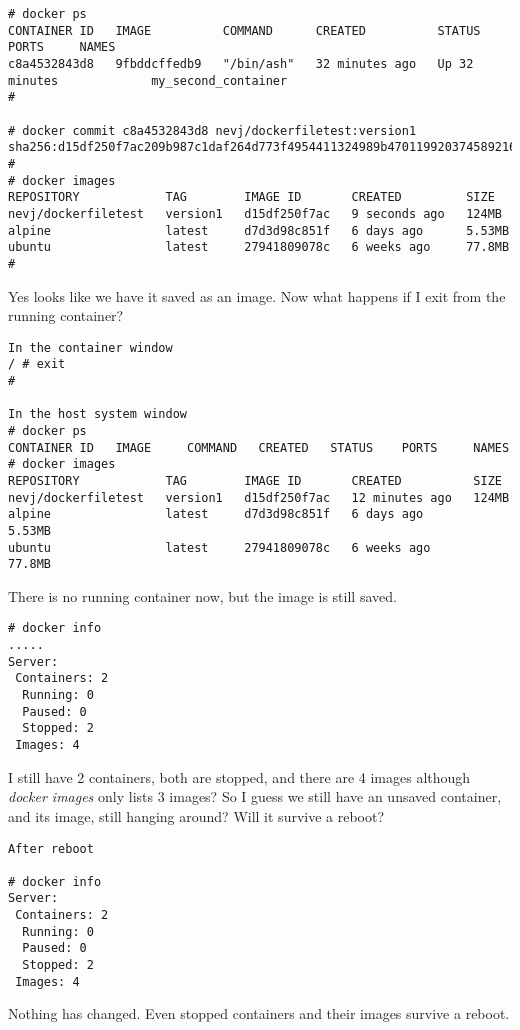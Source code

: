 \documentclass{article}  %
\begin{document}
\begin{verbatim}
# docker ps
CONTAINER ID   IMAGE          COMMAND      CREATED          STATUS          PORTS     NAMES
c8a4532843d8   9fbddcffedb9   "/bin/ash"   32 minutes ago   Up 32 minutes             my_second_container
# 

# docker commit c8a4532843d8 nevj/dockerfiletest:version1
sha256:d15df250f7ac209b987c1daf264d773f4954411324989b470119920374589216
# 
# docker images
REPOSITORY            TAG        IMAGE ID       CREATED         SIZE
nevj/dockerfiletest   version1   d15df250f7ac   9 seconds ago   124MB
alpine                latest     d7d3d98c851f   6 days ago      5.53MB
ubuntu                latest     27941809078c   6 weeks ago     77.8MB
# 
\end{verbatim}
 Yes looks like we have it saved as an image.
Now what happens if I exit from the running container?
\begin{verbatim}
In the container window
/ # exit
# 

In the host system window
# docker ps
CONTAINER ID   IMAGE     COMMAND   CREATED   STATUS    PORTS     NAMES
# docker images
REPOSITORY            TAG        IMAGE ID       CREATED          SIZE
nevj/dockerfiletest   version1   d15df250f7ac   12 minutes ago   124MB
alpine                latest     d7d3d98c851f   6 days ago       5.53MB
ubuntu                latest     27941809078c   6 weeks ago      77.8MB
\end{verbatim}
 There is no running container now, but the image is still saved. 
\begin{verbatim}
# docker info
.....
Server:
 Containers: 2
  Running: 0
  Paused: 0
  Stopped: 2
 Images: 4
\end{verbatim}
I still have 2 containers, both are stopped, and there are 4 images although {\em docker images} only lists 3 images?
So I guess we still have an unsaved container, and its image, still hanging around?  Will it survive a reboot?

\begin{verbatim}
After reboot

# docker info
Server:
 Containers: 2
  Running: 0
  Paused: 0
  Stopped: 2
 Images: 4
\end{verbatim}
Nothing has changed. Even stopped containers and their images survive a reboot.
\end{document}
